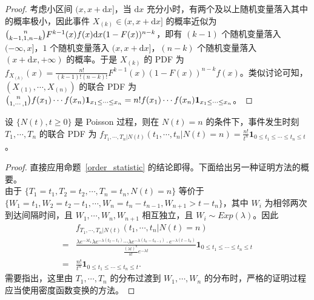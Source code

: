 \documentclass[../main.tex]{subfiles}
\begin{document}
\begin{proof}
    考虑小区间 $(x,x+\mathrm dx]$，当 $\mathrm dx$ 充分小时，有两个及以上随机变量落入其中的概率极小，因此事件 $X_{(k)}\in(x,x+\mathrm dx]$ 的概率近似为 $\tbinom{n}{k-1,1,n-k}F^{k-1}(x)f(x)\mathrm dx(1-F(x))^{n-k}$，即有 $(k-1)$ 个随机变量落入 $(-\infty,x]$，$1$ 个随机变量落入 $(x,x+\mathrm dx]$，$(n-k)$ 个随机变量落入 $(x+\mathrm dx,+\infty)$ 的概率。于是 $X_{(k)}$ 的 PDF 为 $f_{X_{(k)}}(x)=\frac{n!}{(k-1)!(n-k)!}F^{k-1}(x)(1-F(x))^{n-k}f(x)$。类似讨论可知，$(X_{(1)},\cdots,X_{(n)})$ 的联合 PDF 为 $\tbinom{n}{1,\cdots,1}f(x_1)\cdots f(x_n)\mathbf 1_{x_1\leq\cdots\leq x_n}=n!f(x_1)\cdots f(x_n)\mathbf 1_{x_1\leq\cdots\leq x_n}$。
\end{proof}

\begin{theorem}\label{thm:6.3.5}
    设 $\{N(t),t\geq0\}$ 是 Poisson 过程，则在 $N(t)=n$ 的条件下，事件发生时刻 $T_1,\cdots,T_n$ 的联合 PDF 为 $f_{T_1,\cdots,T_n|N(t)}(t_1,\cdots,t_n|N(t)=n)=\frac{n!}{t^n}\mathbf 1_{0\leq t_1\leq\cdots\leq t_n\leq t}$。
\end{theorem}

\begin{proof}
    直接应用命题~\ref{order_statistic} 的结论即得。下面给出另一种证明方法的概要。\\
    由于 $\{T_1=t_1,T_2=t_2,\cdots,T_n=t_n,N(t)=n\}$ 等价于 $\{W_1=t_1,W_2=t_2-t_1,\cdots,W_n=t_n-t_{n-1},W_{n+1}>t-t_n\}$，其中 $W_i$ 为相邻两次到达间隔时间，且 $W_1,\cdots,W_n,W_{n+1}$ 相互独立，且 $W_i\sim Exp(\lambda)$。因此
    \begin{equation*}
        \begin{aligned}
              & f_{T_1,\cdots,T_n|N(t)}(t_1,\cdots,t_n|N(t)=n)                                                                                                                                                                    \\
            = & \frac{\lambda e^{-\lambda t_1}\lambda e^{-\lambda(t_2-t_1)}\cdots\lambda e^{-\lambda(t_n-t_{n-1})}\cdot e^{-\lambda(t-t_n)}}{\frac{(\lambda t)^n}{n!}e^{-\lambda t}}\mathbf 1_{0\leq t_1\leq\cdots\leq t_n\leq t} \\
            = & \frac{n!}{t^n}\mathbf 1_{0\leq t_1\leq\cdots\leq t_n\leq t}.
        \end{aligned}
    \end{equation*}
    需要指出，这里由 $T_1,\cdots,T_n$ 的分布过渡到 $W_1,\cdots,W_n$ 的分布时，严格的证明过程应当使用密度函数变换的方法。
\end{proof}
\end{document}
